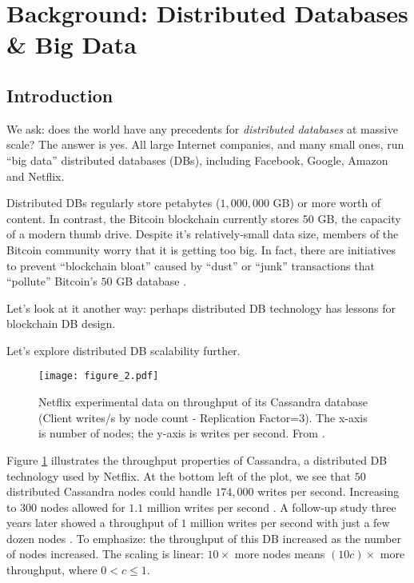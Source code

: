 \section{Background: Distributed Databases \& Big Data}\label{sec:distributed}

\subsection{Introduction}
We ask: does the world have any precedents for \textit{distributed databases} at massive scale? The answer is yes.
All large Internet companies, and many small ones, run “big data” distributed databases (DBs), including Facebook, Google, Amazon and Netflix.

Distributed DBs regularly store petabytes ($1,000,000$ GB) or more worth of content. 
In contrast, the Bitcoin blockchain currently stores $50$ GB, the capacity of a modern thumb drive.
Despite it's relatively-small data size, members of the Bitcoin community worry that it is getting too big. In fact, there are initiatives to prevent “blockchain bloat” caused by “dust” or “junk” transactions that “pollute” Bitcoin’s $50$ GB database \cite{wagner2014blockchain_bloat}.

Let’s look at it another way: perhaps distributed DB technology has lessons for blockchain DB design.

\medskip
\centerline{Let’s explore distributed DB scalability further.}

\begin{figure}[!ht]
  \centering
  \texttt{[image: figure\_2.pdf]}
  \caption{Netflix experimental data on throughput of its Cassandra database (Client writes/s by node count - Replication Factor=$3$).
  The x-axis is number of nodes; the y-axis is writes per second. From \cite{cockcroft2011benchmarking}.}
  \label{fig:cassandra_throughput}
\end{figure}

\medskip
Figure \ref{fig:cassandra_throughput} illustrates the throughput properties of Cassandra, a distributed DB technology used by Netflix.
At the bottom left of the plot, we see that $50$ distributed Cassandra nodes could handle $174,000$ writes per second.
Increasing to $300$ nodes allowed for $1.1$ million writes per second \cite{cockcroft2011benchmarking}.
A follow-up study three years later showed a throughput of $1$ million writes per second with just a few dozen nodes \cite{kalantzis_netflix}.
To emphasize: the throughput of this DB increased as the number of nodes increased. The scaling is linear: $10\times$ more nodes means $(10c)\times$ more throughput, where $0 < c \leq 1$.

